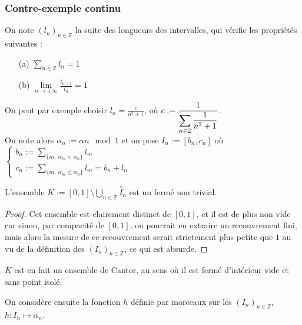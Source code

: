 \documentclass[11pt,a4paper]{article}
\begin{document}
\subsubsection{Contre-exemple continu} 

On note $(l_n)_{n\in \mathbb{Z}}$ la suite des longueurs des intervalles,  qui vérifie les propriétés suivantes : 
\begin{enumerate}

\item[(a)] $\displaystyle \sum_{n\in \mathbb{Z}} l_n = 1$ 

\item[(b)]$\displaystyle \lim\limits_{n \to \pm \infty } \frac{l_{n+1}}{l_n} = 1 $

\end{enumerate} On peut par exemple choisir $l_n = \displaystyle \frac{c}{n^2 + 1}$, où $c:=\displaystyle \frac{1}{\displaystyle \sum_{n\in\mathbb Z} \frac{1}{n^2+1}}$. \\
On note alors $ \alpha_n := \alpha n \mod 1$ et on pose $I_n := [b_n , c_n]$ où $\begin{cases} b_n := \displaystyle \sum_{\{m, \ \alpha_m < \alpha_n\}} l_m \\ c_n := \displaystyle \sum_{\{m, \ \alpha_m \leq \alpha_n\}} l_m  = b_n + l_n \end{cases}$ \\


\begin{lemma}\label{cantor}
L'ensemble $\displaystyle K := [0,1] \setminus \bigcup_{n\in \mathbb{Z}} \overset{\circ}I_n$ est un fermé non trivial.
\end{lemma}

\begin{proof}
Cet ensemble est clairement distinct de $[0,1]$, et il est de plus non vide car sinon, par compacité de $[0,1]$, on pourrait en extraire un recouvrement fini, mais alors la mesure de ce recouvrement serait strictement plus petite que $1$ au vu de la définition des $(I_n)_{n\in\mathbb{Z}}$, ce qui est absurde. 
\end{proof}


\begin{rmq}
$K$ est en fait un ensemble de Cantor, au sens où il est fermé d'intérieur vide et sans point isolé.
\end{rmq}

On considère ensuite la fonction $h$ définie par morceaux sur les $(I_n)_{n\in\mathbb{Z}}$, $h : I_n \mapsto \alpha_n$. 
\end{document}

